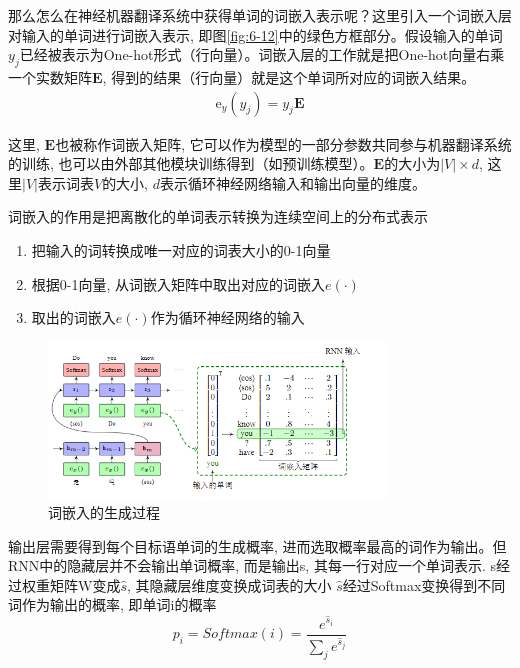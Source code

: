 \documentclass[a4paper]{article}
\newcommand{\parinterval}{\noindent\hspace{2em}}%
\begin{document}
    \parinterval 那么怎么在神经机器翻译系统中获得单词的词嵌入表示呢？这里引入一个词嵌入层对输入的单词进行词嵌入表示, 即图\ref{fig:6-12}中的绿色方框部分。假设输入的单词$y_j$已经被表示为One-hot形式（行向量）。词嵌入层的工作就是把One-hot向量右乘一个实数矩阵$\mathbf{E}$, 得到的结果（行向量）就是这个单词所对应的词嵌入结果。
    \begin{eqnarray}
    \textrm{e}_y (y_j) = y_j \mathbf{E} 
    \end{eqnarray} 

    \noindent 这里, $\mathbf{E}$也被称作词嵌入矩阵, 它可以作为模型的一部分参数共同参与机器翻译系统的训练, 也可以由外部其他模块训练得到（如预训练模型）。$\mathbf{E}$的大小为$|V| \times d$, 这里$|V|$表示词表$V$的大小, $d$表示循环神经网络输入和输出向量的维度。
    

    词嵌入的作用是把离散化的单词表示转换为连续空间上的分布式表示
    \begin{enumerate}
        \item   把输入的词转换成唯一对应的词表大小的0-1向量
        \item 根据0-1向量, 从词嵌入矩阵中取出对应的词嵌入$e(\cdot)$
        \item 取出的词嵌入$e(\cdot)$作为循环神经网络的输入
    \end{enumerate} 
  
    
    
\begin{figure}[htp]
    \centering
    \includegraphics[width=0.8\textwidth]{NMLEmbed.png}
    \caption{词嵌入的生成过程}
 
    \end{figure}

输出层需要得到每个目标语单词的生成概率, 进而选取概率最高的词作为输出。但RNN中的隐藏层并不会输出单词概率, 而是输出s, 其每一行对应一个单词表示.
s经过权重矩阵W变成$\hat{s}$, 其隐藏层维度变换成词表的大小
$\hat{s}$经过Softmax变换得到不同词作为输出的概率, 即单词i的概率
$$p_i= Softmax(i) = \frac{{e^{\hat{s}_i}}}{{\sum_j e^{\hat{s}_j}}}$$
 
\end{document}

